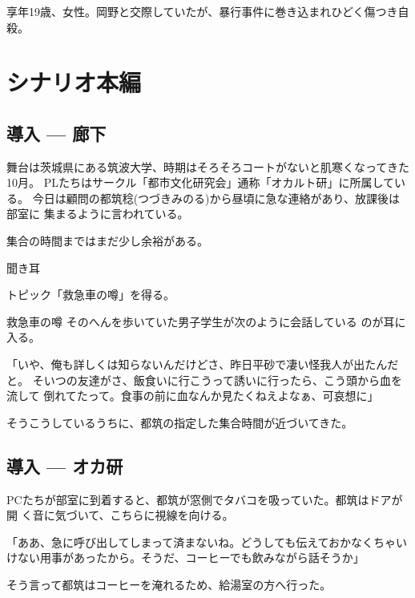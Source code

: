 \documentclass[a4paper,8pt,min]{jsarticle}
\begin{document}
\subsubsection{}
享年19歳、女性。岡野と交際していたが、暴行事件に巻き込まれひどく傷つき自
殺。

\newpage
\section{シナリオ本編}
\subsection{導入 --- 廊下}
舞台は茨城県にある筑波大学、時期はそろそろコートがないと肌寒くなってきた10月。
PLたちはサークル「都市文化研究会」通称「オカルト研」に所属している。
今日は顧問の都筑稔(つづきみのる)から昼頃に急な連絡があり、放課後は部室に
集まるように言われている。

集合の時間まではまだ少し余裕がある。

\begin{judge}{聞き耳}
 \item トピック「救急車の噂」を得る。
\end{judge}

\begin{topic}
 \item[救急車の噂] そのへんを歩いていた男子学生が次のように会話している
 のが耳に入る。

「いや、俺も詳しくは知らないんだけどさ、昨日平砂で凄い怪我人が出たんだと。
そいつの友達がさ、飯食いに行こうって誘いに行ったら、こう頭から血を流して
 倒れてたって。食事の前に血なんか見たくねえよなぁ、可哀想に」
\end{topic}

そうこうしているうちに、都筑の指定した集合時間が近づいてきた。

\subsection{導入 --- オカ研}
PCたちが部室に到着すると、都筑が窓側でタバコを吸っていた。都筑はドアが開
く音に気づいて、こちらに視線を向ける。

「ああ、急に呼び出してしまって済まないね。どうしても伝えておかなくちゃい
けない用事があったから。そうだ、コーヒーでも飲みながら話そうか」

そう言って都筑はコーヒーを淹れるため、給湯室の方へ行った。\\
\end{document}
